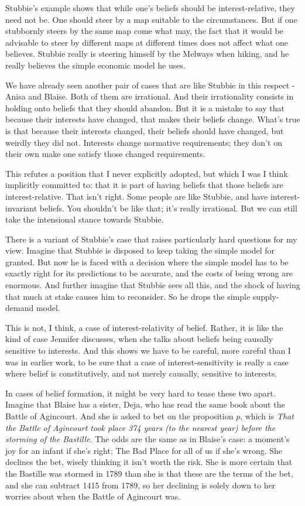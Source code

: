 \documentclass[11pt,]{book}
\begin{document}
Stubbie's example shows that while one's beliefs should be interest-relative, they need not be. One should steer by a map suitable to the circumstances. But if one stubbornly steers by the same map come what may, the fact that it would be advisable to steer by different maps at different times does not affect what one believes. Stubbie really is steering himself by the Melways when hiking, and he really believes the simple economic model he uses.

We have already seen another pair of cases that are like Stubbie in this respect - Anisa and Blaise. Both of them are irrational. And their irrationality consists in holding onto beliefs that they should abandon. But it is a mistake to say that because their interests have changed, that makes their beliefs change. What's true is that because their interests changed, their beliefs should have changed, but weirdly they did not. Interests change normative requirements; they don't on their own make one satisfy those changed requirements.

This refutes a position that I never explicitly adopted, but which I was I think implicitly committed to: that it is part of having beliefs that those beliefs are interest-relative. That isn't right. Some people are like Stubbie, and have interest-invariant beliefs. You shouldn't be like that; it's really irrational. But we can still take the intensional stance towards Stubbie.

There is a variant of Stubbie's case that raises particularly hard questions for my view. Imagine that Stubbie is disposed to keep taking the simple model for granted. But now he is faced with a decision where the simple model has to be exactly right for its predictions to be accurate, and the costs of being wrong are enormous. And further imagine that Stubbie sees all this, and the shock of having that much at stake causes him to reconsider. So he drops the simple supply-demand model.

This is not, I think, a case of interest-relativity of belief. Rather, it is like the kind of case Jennifer \citet{Nagel2010} discusses, when she talks about beliefs being causally sensitive to interests. And this shows we have to be careful, more careful than I was in earlier work, to be sure that a case of interest-sensitivity is really a case where belief is constitutively, and not merely causally, sensitive to interests.

In cases of belief formation, it might be very hard to tease these two apart. Imagine that Blaise has a sister, Deja, who has read the same book about the Battle of Agincourt. And she is asked to bet on the proposition \(p\), which is \emph{That the Battle of Agincourt took place 374 years (to the nearest year) before the storming of the Bastille}. The odds are the same as in Blaise's case: a moment's joy for an infant if she's right; The Bad Place for all of us if she's wrong. She declines the bet, wisely thinking it isn't worth the risk. She is more certain that the Bastille was stormed in 1789 than she is that these are the terms of the bet, and she can subtract 1415 from 1789, so her declining is solely down to her worries about when the Battle of Agincourt was.
\end{document}

